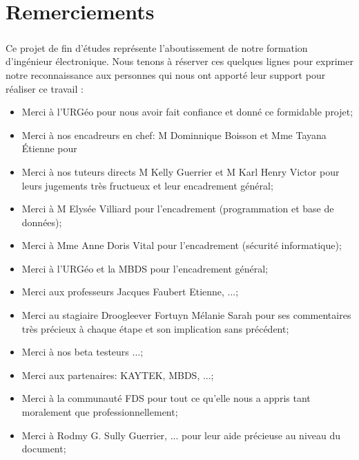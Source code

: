 \chapter*{Remerciements}
\paragraph{}
Ce projet de fin d’études représente l'aboutissement de notre formation d’ingénieur électronique. 
Nous tenons à réserver ces quelques lignes pour exprimer notre
reconnaissance aux personnes qui nous ont apporté leur support pour réaliser ce travail :

\begin{itemize}
    \item Merci à l'URGéo pour nous avoir fait confiance et donné ce formidable projet;\par
    \item Merci à nos encadreurs en chef: M Dominnique Boisson et Mme Tayana Étienne pour \par
    \item Merci à nos tuteurs directs M Kelly Guerrier et M Karl Henry Victor pour leurs 
    jugements très fructueux et leur encadrement général;\par
    \item Merci à  M Elysée Villiard pour l'encadrement (programmation et base de données);\par
    \item Merci à Mme Anne Doris Vital pour l'encadrement (sécurité informatique);\par
    \item Merci à l'URGéo et la MBDS pour l'encadrement général;\par
    \item Merci aux professeurs Jacques Faubert Etienne, ...;\par
    \item Merci au stagiaire Droogleever Fortuyn Mélanie Sarah pour ses commentaires 
    très précieux à chaque étape et son implication sans précédent; \par
    \item Merci à nos beta testeurs ...;\par
    \item Merci aux partenaires: KAYTEK, MBDS, ...;\par
    \item Merci à la communauté FDS pour tout ce qu'elle nous a appris tant 
    moralement que professionnellement;\par
    \item Merci à Rodmy G. Sully Guerrier, ... pour leur aide précieuse au niveau du document; \par
\end{itemize}
